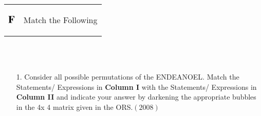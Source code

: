 \documentclass[journal,12pt,twocolumn]{IEEEtran}
\theoremstyle{remark}
\begin{document}
\newpage
\onecolumn
\begin{tabular}{p{1.5cm}p{10cm}}
   $\Large \textbf{F} $  &   \begin{Large}
   Match the Following 
   \end{Large}   
\end{tabular} \\ \\




\begin{enumerate}
    \item[1. ] Consider all possible permutations of the ENDEANOEL. Match the Statements/ Expressions in
\textbf{Column I} with the Statements/ Expressions in \textbf{Column II} and indicate your answer by darkening
the appropriate bubbles in the 4x 4 matrix given in the ORS.\hfill $(2008)$\\  
    
\end{enumerate}
\end{document}
